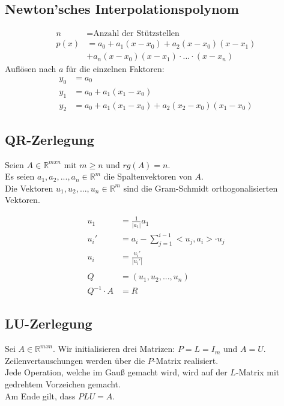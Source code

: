 \documentclass[a4paper, 11pt]{article}
\begin{document}
\begin{multicols}{3}
\begin{small}
		\subsection{Newton'sches Interpolationspolynom}
			\begin{align*}
			n &= \text{Anzahl der Stützstellen}\\
			p(x) &= a_0 + a_1(x - x_0) + a_2(x - x_0)(x - x_1)\\
			     &+ a_n(x-x_0)(x - x_1)\cdot ... \cdot (x - x_n)
			\end{align*}
			     Auflösen nach $a$ für die einzelnen Faktoren:
			\begin{align*}
			y_0 &= a_0\\
			y_1 &= a_0 + a_1(x_1 - x_0)	\\
			y_2 &= a_0 + a_1(x_1 - x_0) + a_2(x_2 - x_0)(x_1 - x_0)
			\end{align*}
		\subsection{QR-Zerlegung}
			Seien $A \in \mathbb{R}^{mxn}$ mit $m \ge n$ und $rg(A) = n$.\\
			 Es seien $a_1, a_2, ..., a_n \in \mathbb{R}^m$ die Spaltenvektoren von $A$. \\
			 Die Vektoren $u_1, u_2, ..., u_n \in \mathbb{R}^m$ sind die Gram-Schmidt orthogonalisierten Vektoren.
			 
			 \begin{align*}
			 	u_1 &= \frac{1}{|a_1|} a_1\\
			 	u_i' &= a_i - \sum_{j = 1}^{i-1} <u_j, a_i> \cdot u_j\\
			 	u_i &= \frac{u_i'}{|u_i'|}
			 	\\\\
			 	Q &= (u_1, u_2, ..., u_n)\\
			 	Q^{-1}\cdot A &= R 
			 	\end{align*}
		\subsection{LU-Zerlegung}
			Sei $A \in \mathbb{R}^{mxn}$. Wir initialisieren drei Matrizen: $P = L = I_m$ und $A = U$.\\
			Zeilenvertauschungen werden über die $P$-Matrix realisiert. \\
			Jede Operation, welche im Gauß gemacht wird, wird auf der $L$-Matrix mit gedrehtem Vorzeichen gemacht.\\
			Am Ende gilt, dass $PLU = A$.

\end{small}
\end{multicols}
\end{document}
